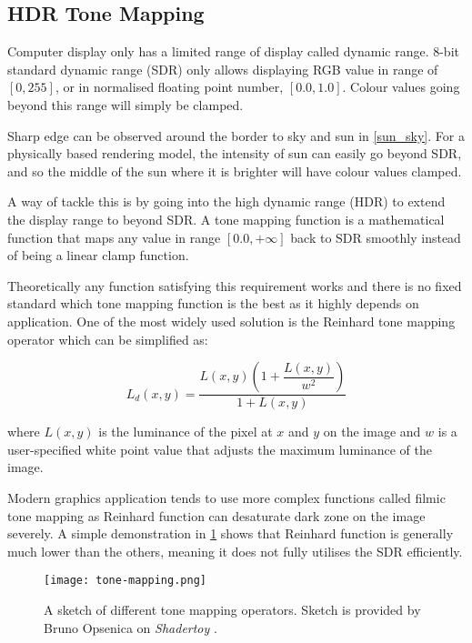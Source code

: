 \documentclass[oneside, a4paper]{report}
\begin{document}
    \subsection{HDR Tone Mapping}

    Computer display only has a limited range of display called dynamic range. 8-bit standard dynamic range (SDR) only allows displaying RGB value in range of \([0, 255]\), or in normalised floating point number, \([0.0, 1.0]\). Colour values going beyond this range will simply be clamped.

    Sharp edge can be observed around the border to sky and sun in \ref{sun_sky}. For a physically based rendering model, the intensity of sun can easily go beyond SDR, and so the middle of the sun where it is brighter will have colour values clamped.

    A way of tackle this is by going into the high dynamic range (HDR) to extend the display range to beyond SDR. A tone mapping function is a mathematical function that maps any value in range \([0.0, +\infty]\) back to SDR smoothly instead of being a linear clamp function.

    Theoretically any function satisfying this requirement works and there is no fixed standard which tone mapping function is the best as it highly depends on application. One of the most widely used solution is the Reinhard tone mapping operator \cite{reinhard} which can be simplified as:

    \begin{equation}
        L_{d}(x, y) = \frac{L(x, y)(1 + \dfrac{L(x, y)}{w^{2}})}{1 + L(x, y)}
    \end{equation}

    where \(L(x, y)\) is the luminance of the pixel at $x$ and $y$ on the image and $w$ is a user-specified white point value that adjusts the maximum luminance of the image.

    Modern graphics application tends to use more complex functions called filmic tone mapping as Reinhard function can desaturate dark zone on the image severely. A simple demonstration in \ref{tmo} shows that Reinhard function is generally much lower than the others, meaning it does not fully utilises the SDR efficiently.

    \begin{figure}[H]
        \texttt{[image: tone-mapping.png]}
        \caption{A sketch of different tone mapping operators. Sketch is provided by Bruno Opsenica on \textit{Shadertoy} \cite{shadertoy_tmo}.}
        \label{tmo}
    \end{figure}
\end{document}
